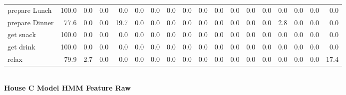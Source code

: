 \documentclass{article}
\begin{document}
\begin{sideways}
\begin{tabular}{lrrrrrrrrrrrrrrrrr}
prepare Lunch         &       100.0 &                0.0 &           0.0 &                          0.0 &                0.0 &                0.0 &                        0.0 &          0.0 &              0.0 &                0.0 &                    0.0 &                      0.0 &                  0.0 &                   0.0 &              0.0 &              0.0 &          0.0 \\
prepare Dinner        &        77.6 &                0.0 &           0.0 &                         19.7 &                0.0 &                0.0 &                        0.0 &          0.0 &              0.0 &                0.0 &                    0.0 &                      0.0 &                  0.0 &                   2.8 &              0.0 &              0.0 &          0.0 \\
get snack             &       100.0 &                0.0 &           0.0 &                          0.0 &                0.0 &                0.0 &                        0.0 &          0.0 &              0.0 &                0.0 &                    0.0 &                      0.0 &                  0.0 &                   0.0 &              0.0 &              0.0 &          0.0 \\
get drink             &       100.0 &                0.0 &           0.0 &                          0.0 &                0.0 &                0.0 &                        0.0 &          0.0 &              0.0 &                0.0 &                    0.0 &                      0.0 &                  0.0 &                   0.0 &              0.0 &              0.0 &          0.0 \\
relax                 &        79.9 &                2.7 &           0.0 &                          0.0 &                0.0 &                0.0 &                        0.0 &          0.0 &              0.0 &                0.0 &                    0.0 &                      0.0 &                  0.0 &                   0.0 &              0.0 &              0.0 &         17.4 \\
\bottomrule
\end{tabular}
\end{sideways}
\normalsize
\vspace{1cm}\\
\textbf{House C Model HMM Feature Raw}\\
\vspace{1cm}\\
\end{document}
